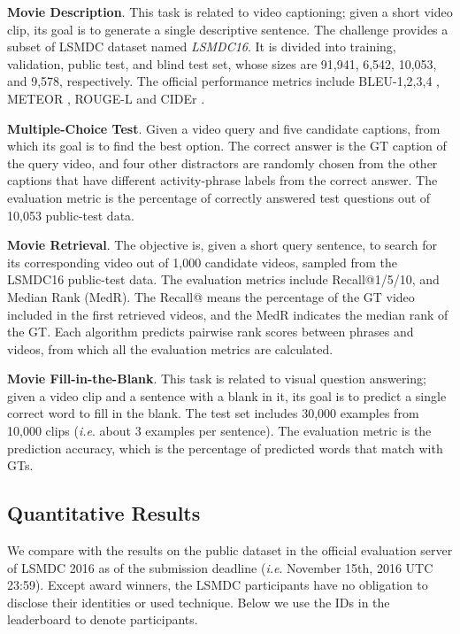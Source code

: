 \documentclass[10pt,twocolumn,letterpaper]{article}
\makeatletter
\theoremstyle{nonumberplain}
\DeclareRobustCommand\onedot{\futurelet\@let@token\@onedot}
\def\onedot{.\@\xspace}
\def\ie{\emph{i.e}\onedot} \def\Ie{\emph{I.e}\onedot}
\makeatother
\begin{document}
\smallskip
\textbf{Movie Description}.
This task is related to video captioning; given a short video clip, its goal is to generate a single descriptive sentence. The challenge provides a subset of LSMDC dataset named \textit{LSMDC16}. It is divided into training, validation, public test, and blind test set, whose sizes are 91,941, 6,542, 10,053, and 9,578, respectively.
The official performance metrics include BLEU-1,2,3,4 \cite{Papineni-acl-2002}, METEOR \cite{Banerjee-acl-2005}, ROUGE-L \cite{Lin-was-2004} and CIDEr \cite{Vedantam-arxiv-2014}.

\textbf{Multiple-Choice Test}.
Given a video query and five candidate captions, from which its goal is to find the best option.
The correct answer is the GT caption of the query video, and four other distractors are randomly chosen from the other captions that have different activity-phrase labels from the correct answer.
The evaluation metric is the percentage of correctly answered test questions out of 10,053 public-test data.

\textbf{Movie Retrieval}.
The objective is, given a short query sentence, to search for its corresponding video out of 1,000 candidate videos, sampled from the LSMDC16 public-test data.
The evaluation metrics include Recall@1/5/10, and Median Rank (MedR).
The Recall@ means the percentage of the GT video included in the first  retrieved videos,
and the MedR indicates the median rank of the GT.
Each algorithm predicts  pairwise rank scores between phrases and videos, from which all the evaluation metrics are calculated.

\textbf{Movie Fill-in-the-Blank}.
This task is related to visual question answering;
given a video clip and a sentence with a blank in it, its goal is to predict a single correct word to fill in the blank.
The test set includes 30,000 examples from 10,000 clips (\ie about 3 examples per sentence).
The evaluation metric is the prediction accuracy, which is the percentage of predicted words that match with GTs.


\subsection{Quantitative Results}
\label{sec:quant_results}

We compare with the results on the public dataset in the official evaluation server of LSMDC 2016 as of the submission deadline
(\ie November 15th, 2016 UTC 23:59).
Except award winners, the LSMDC participants have no obligation to disclose their identities or used technique. 
Below we use the IDs in the leaderboard to denote participants. 
\end{document}
